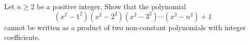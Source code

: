 Let $n\geq 2$ be a positive integer. Show that the polynomial
$$(x^2-1^2)(x^2-2^2)(x^2-3^2)\cdots (x^2-n^2)+1$$
cannot be written as a product of two non-constant polynomials with integer coefficients.